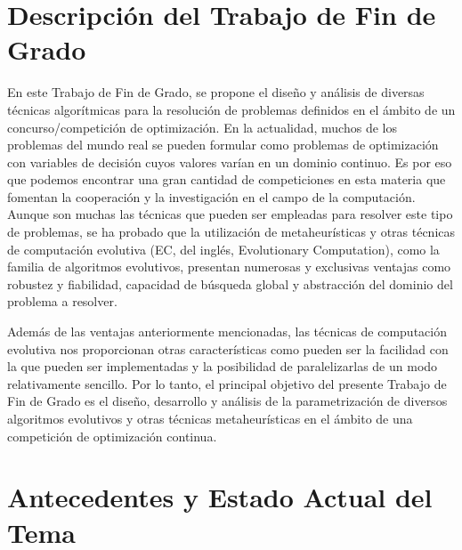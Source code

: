 
\section{Descripción del Trabajo de Fin de Grado}
\label{sec:DESCRIPTION}

En este Trabajo de Fin de Grado, se propone el diseño y análisis de diversas técnicas algorítmicas para la resolución de problemas definidos en el ámbito de un concurso/competición de optimización.
	En la actualidad,  muchos de los problemas del mundo real se pueden formular como problemas de optimización con variables de decisión cuyos valores varían en un dominio continuo. Es por eso que podemos encontrar una gran cantidad de competiciones en esta materia que fomentan la cooperación y la investigación en el campo de la computación. Aunque son muchas las técnicas que pueden ser empleadas para resolver este tipo de problemas, se ha probado que la utilización de metaheurísticas y otras técnicas de computación evolutiva (EC, del inglés, Evolutionary Computation), como la familia de algoritmos evolutivos, presentan numerosas y exclusivas ventajas como robustez y fiabilidad, capacidad de búsqueda global y abstracción del dominio del problema a resolver.

Además de las ventajas anteriormente mencionadas, las técnicas de computación evolutiva nos proporcionan otras características como pueden ser la facilidad con la que pueden ser implementadas y la posibilidad de paralelizarlas de un modo relativamente sencillo.
	Por lo tanto, el principal objetivo del presente Trabajo de Fin de Grado es el diseño, desarrollo y análisis de la parametrización de diversos algoritmos evolutivos y otras técnicas metaheurísticas en el ámbito de una competición de optimización continua. 
\section{Antecedentes y Estado Actual del Tema}
\label{sec:SUBJECT}

